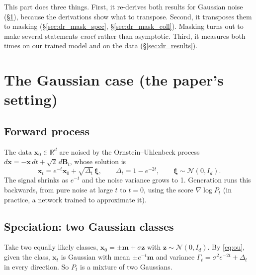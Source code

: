 This part does three things. First, it re-derives both results for Gaussian noise (\S\ref{sec:dr_gauss}), because
the derivations show what to transpose. Second, it transposes them to masking (\S\ref{sec:dr_mask_spec},
\S\ref{sec:dr_mask_coll}). Masking turns out to make several statements \emph{exact} rather than asymptotic. Third,
it measures both times on our trained model and on the data (\S\ref{sec:dr_results}).

\section{The Gaussian case (the paper's setting)}\label{sec:dr_gauss}
\subsection{Forward process}
The data $\bm x_0\in\mathbb R^d$ are noised by the Ornstein--Uhlenbeck process
$d\bm x=-\bm x\,dt+\sqrt2\,d\bm B_t$, whose solution is
\begin{equation}\label{eq:ou}
\bm x_t=e^{-t}\bm x_0+\sqrt{\Delta_t}\,\bm\xi,\qquad \Delta_t=1-e^{-2t},\qquad \bm\xi\sim\mathcal N(0,I_d).
\end{equation}
The signal shrinks as $e^{-t}$ and the noise variance grows to 1. Generation runs this backwards, from pure noise at
large $t$ to $t=0$, using the score $\nabla\log P_t$ (in practice, a network trained to approximate it).

\subsection{Speciation: two Gaussian classes}\label{sec:dr_gauss_spec}
Take two equally likely classes, $\bm x_0=\pm\bm m+\sigma\bm z$ with $\bm z\sim\mathcal N(0,I_d)$. By
\eqref{eq:ou}, given the class, $\bm x_t$ is Gaussian with mean $\pm e^{-t}\bm m$ and variance
$\Gamma_t=\sigma^2e^{-2t}+\Delta_t$ in every direction. So $P_t$ is a mixture of two Gaussians.


